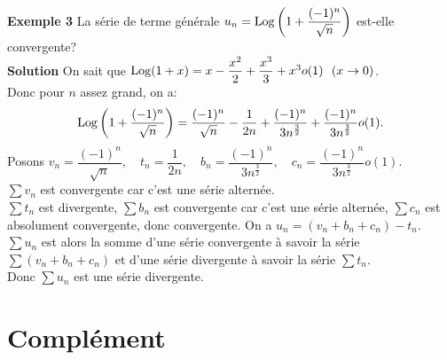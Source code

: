 \documentclass[11pt, a4paper]{book}
\begin{document}
\textbf{Exemple 3}\quad 
La s\'erie de terme g\'en\'erale $u_n=\mathrm{Log} \left(1+\dfrac{(-1)^n}{\sqrt{n}}\right)$ est-elle convergente?\\
\textbf{Solution}\quad
On sait que $\mathrm{Log} (1+x)=x-\dfrac{x^2}{2}+\dfrac{x^3}{3}+x^3o(1) ~~(x\rightarrow0)$.\\
Donc pour $n$ assez grand, on a: $$ \mathrm{Log} \left(1+\dfrac{(-1)^n}{\sqrt{n}}\right)=\dfrac{(-1)^n}{\sqrt{n}}-\dfrac{1}{2n}+\dfrac{(-1)^n}{3n^{\frac{3}{2}}}+\dfrac{(-1)^n}{3n^{\frac{3}{2}}}o(1).$$
Posons $v_n=\dfrac{(-1)^n}{\sqrt{n}},\quad t_n=\dfrac{1}{2n}, \quad	b_n=\dfrac{(-1)^n}{3n^{\frac{3}{2}}},\quad c_n=\dfrac{(-1)^n}{3n^{\frac{3}{2}}}o(1).$\\
$\sum v_n$ est convergente car c'est une s\'erie altern\'ee.\\
$\sum t_n$ est divergente, $\sum b_n$ est convergente car c'est une s\'erie altern\'ee, $\sum c_n$ est absolument convergente, donc convergente. On a $u_n=(v_n+b_n+c_n)-t_n$.\\
$\sum u_n$ est alors la somme d'une s\'erie convergente \`a savoir la s\'erie $\sum (v_n+b_n+c_n)$ et d'une s\'erie divergente \`a savoir la s\'erie $\sum t_n$. \\
Donc $\sum u_n$ est une s\'erie divergente.

\section{Compl\'ement}
\end{document}
